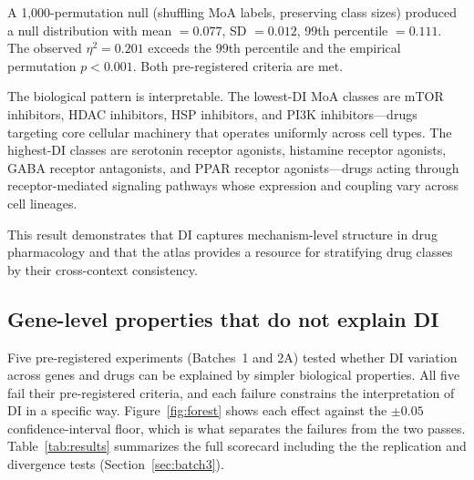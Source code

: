 \documentclass[11pt]{article}
\begin{document}
A 1{,}000-permutation null (shuffling MoA labels, preserving class
sizes) produced a null distribution with mean $= 0.077$,
SD $= 0.012$, 99th percentile $= 0.111$.  The observed
$\eta^2 = 0.201$ exceeds the 99th percentile and the empirical
permutation $p < 0.001$.  Both pre-registered criteria are met.

The biological pattern is interpretable.  The lowest-DI MoA classes are
mTOR inhibitors, HDAC inhibitors, HSP inhibitors, and PI3K
inhibitors---drugs targeting core cellular machinery
\citep{santos2017drug} that operates uniformly across cell types.  The highest-DI classes are serotonin
receptor agonists, histamine receptor agonists, GABA receptor
antagonists, and PPAR receptor agonists---drugs acting through
receptor-mediated signaling pathways whose expression and coupling vary
across cell lineages.

This result demonstrates that DI captures mechanism-level structure in
drug pharmacology and that the atlas provides a resource for stratifying
drug classes by their cross-context consistency.



\subsection{Gene-level properties that do not explain DI}
\label{sec:whatnot}

Five pre-registered experiments (Batches~1 and 2A) tested whether DI
variation across genes and drugs can be explained by simpler biological
properties.  All five fail their pre-registered criteria, and each
failure constrains the interpretation of DI in a specific way.
Figure~\ref{fig:forest} shows each effect against the $\pm 0.05$ confidence-interval
floor, which is what separates the failures from the two passes.
Table~\ref{tab:results} summarizes the full scorecard including the
the replication and divergence tests (Section~\ref{sec:batch3}).
\end{document}

